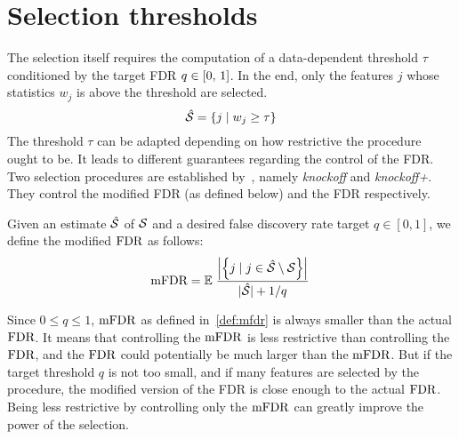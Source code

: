 \section{Selection thresholds}\label{sec:kfs}

The selection itself requires the computation of a data-dependent threshold $\tau$
conditioned by the target FDR $q \in \left[ 0,\, 1 \right]$.
In the end, only the features $j$ whose statistics $w_j$ is above the threshold are selected.
\begin{equation}
    \hat{\mathcal{S}} = \left\{ j \mid w_j \geq \tau \right\}
\end{equation}
The threshold $\tau$ can be adapted depending on how restrictive the procedure ought to be.
It leads to different guarantees regarding the control of the FDR\@.
Two selection procedures are established by~\cite{fixed_x_knockoffs},
namely \emph{knockoff} and \emph{knockoff+}.
They control the modified FDR (as defined below) and the FDR respectively.
\begin{definition}\label{def:mfdr}
Given an estimate $\hat{\mathcal{S}}$ of $\mathcal{S}$ and a desired false discovery rate target $q \in [0, 1]$,
we define the modified $\text{FDR}$ as follows:
\begin{equation*}
    \text{mFDR} = {\mathbb E}\left.
        \frac
            {\left\lvert\left\{ j \mid j \in \hat{\mathcal{S}} \setminus \mathcal{S} \right\}\right\rvert}
            {\lvert\hat{\mathcal{S}}\rvert + 1 / q}
    \right.
\end{equation*}
\end{definition}
Since $0 \leq q \leq 1$, $\text{mFDR}$ as defined in~\ref{def:mfdr} is always smaller than the actual $\text{FDR}$.
It means that controlling the $\text{mFDR}$ is less restrictive than controlling the $\text{FDR}$,
and the $\text{FDR}$ could potentially be much larger than the $\text{mFDR}$.
But if the target threshold $q$ is not too small, and if many features are selected by the procedure,
the modified version of the FDR is close enough to the actual $\text{FDR}$.
Being less restrictive by controlling only the $\text{mFDR}$ can greatly improve the power
of the selection.


